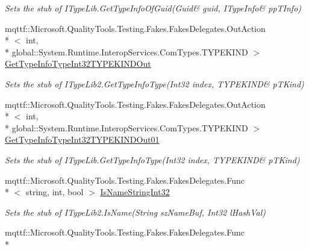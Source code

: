 \begin{DoxyCompactItemize}
\begin{DoxyCompactList}\small\item\em Sets the stub of I\-Type\-Lib.\-Get\-Type\-Info\-Of\-Guid(Guid\& guid, I\-Type\-Info\& pp\-T\-Info)\end{DoxyCompactList}\item 
mqttf\-::\-Microsoft.\-Quality\-Tools.\-Testing.\-Fakes.\-Fakes\-Delegates.\-Out\-Action\\*
$<$ int, \\*
global\-::\-System.\-Runtime.\-Interop\-Services.\-Com\-Types.\-T\-Y\-P\-E\-K\-I\-N\-D $>$ \hyperlink{class_system_1_1_runtime_1_1_interop_services_1_1_com_types_1_1_fakes_1_1_stub_i_type_lib2_ae89a898f9998673092525e0330987c91}{Get\-Type\-Info\-Type\-Int32\-T\-Y\-P\-E\-K\-I\-N\-D\-Out}
\begin{DoxyCompactList}\small\item\em Sets the stub of I\-Type\-Lib2.\-Get\-Type\-Info\-Type(Int32 index, T\-Y\-P\-E\-K\-I\-N\-D\& p\-T\-Kind)\end{DoxyCompactList}\item 
mqttf\-::\-Microsoft.\-Quality\-Tools.\-Testing.\-Fakes.\-Fakes\-Delegates.\-Out\-Action\\*
$<$ int, \\*
global\-::\-System.\-Runtime.\-Interop\-Services.\-Com\-Types.\-T\-Y\-P\-E\-K\-I\-N\-D $>$ \hyperlink{class_system_1_1_runtime_1_1_interop_services_1_1_com_types_1_1_fakes_1_1_stub_i_type_lib2_a86c49d425878e0ebd1c5f5f68f13d4cc}{Get\-Type\-Info\-Type\-Int32\-T\-Y\-P\-E\-K\-I\-N\-D\-Out01}
\begin{DoxyCompactList}\small\item\em Sets the stub of I\-Type\-Lib.\-Get\-Type\-Info\-Type(Int32 index, T\-Y\-P\-E\-K\-I\-N\-D\& p\-T\-Kind)\end{DoxyCompactList}\item 
mqttf\-::\-Microsoft.\-Quality\-Tools.\-Testing.\-Fakes.\-Fakes\-Delegates.\-Func\\*
$<$ string, int, bool $>$ \hyperlink{class_system_1_1_runtime_1_1_interop_services_1_1_com_types_1_1_fakes_1_1_stub_i_type_lib2_a0891ef94b17fd0c1e78df3d76487dfb5}{Is\-Name\-String\-Int32}
\begin{DoxyCompactList}\small\item\em Sets the stub of I\-Type\-Lib2.\-Is\-Name(\-String sz\-Name\-Buf, Int32 l\-Hash\-Val)\end{DoxyCompactList}\item 
mqttf\-::\-Microsoft.\-Quality\-Tools.\-Testing.\-Fakes.\-Fakes\-Delegates.\-Func\\*

\end{DoxyCompactItemize}
